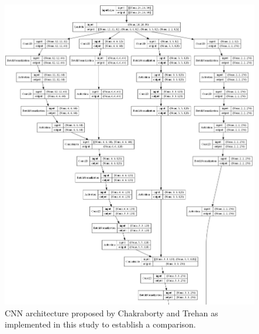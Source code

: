 \begin{figure}[ht]
    \centering
    \includegraphics[width=\linewidth]{figs/vineyard_classification/networks/spectral_net_24x23_64_01.png}
	\caption{CNN architecture proposed by Chakraborty and Trehan \cite{chakraborty_spectralnet_2021} as implemented in this study to establish a comparison. }
	\label{fig:spectralnet_cnn}
\end{figure}

